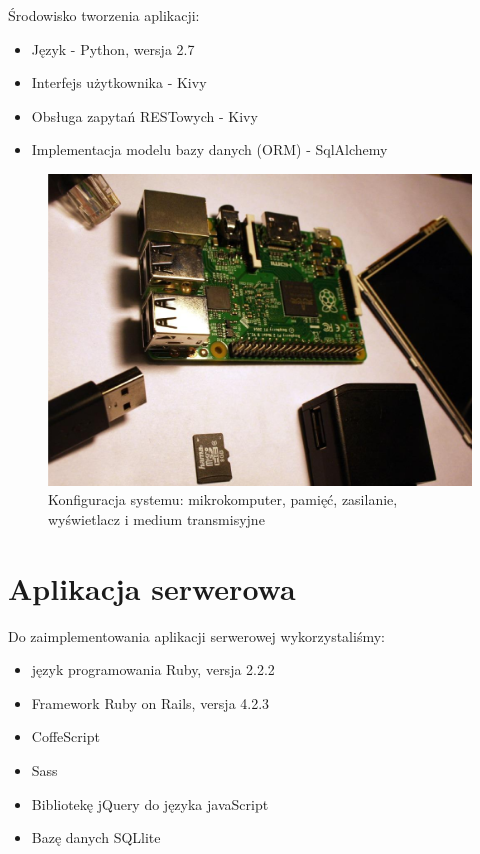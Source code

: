 Środowisko tworzenia aplikacji:
\begin{itemize}
  \item Język - Python, wersja 2.7
  \item Interfejs użytkownika - Kivy
  \item Obsługa zapytań RESTowych - Kivy
  \item Implementacja modelu bazy danych (ORM) - SqlAlchemy
\end{itemize}

\begin{figure}[ht]
  \centering
  \includegraphics[width=\textwidth]{images/konfiguracja.png}
  \caption{Konfiguracja systemu: mikrokomputer, pamięć, zasilanie, wyświetlacz i medium transmisyjne
}
  \label{figure:konfig}
\end{figure}


\section{Aplikacja serwerowa}

Do zaimplementowania aplikacji serwerowej wykorzystaliśmy:

\begin{itemize}
  \item język programowania Ruby, versja 2.2.2 \cite{bib:ruby-doc}
  \item Framework Ruby on Rails, versja 4.2.3 \cite{bib:rails-doc}
  \item CoffeScript \cite{bib:coffeescript-doc}
  \item Sass \cite{bib:sass-doc}
  \item Bibliotekę jQuery do języka javaScript \cite{bib:jquery-doc}
  \item Bazę danych SQLlite
\end{itemize}

